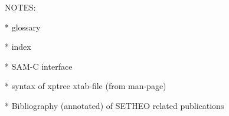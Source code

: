 NOTES:

* glossary

* index

* SAM-C interface

* syntax of xptree xtab-file (from man-page)

* Bibliography (annotated) of SETHEO related publications
